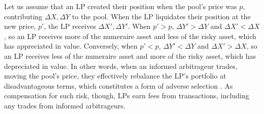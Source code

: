 \documentclass[11pt]{article}
\begin{document}
Let us assume that an LP created their position when the pool's price was $p$, contributing $\Delta X, \Delta Y$ to the pool. When the LP liquidates their position at the new price, $p'$, the LP receives $\Delta X', \Delta Y'$. When $p' > p$, $\Delta Y' > \Delta Y$ and $\Delta X' < \Delta X$, so an LP receives more of the numeraire asset and less of the risky asset, which has appreciated in value. Conversely, when $p' < p$, $\Delta Y' < \Delta Y$ and $\Delta X' > \Delta X$, so an LP receives less of the numeraire asset and more of the risky asset, which has depreciated in value. In other words, when an informed arbitrageur trades, moving the pool's price, they effectively rebalance the LP's portfolio at disadvantageous terms, which constitutes a form of adverse selection \citep{Lehar2021DecentralizedE}.
As compensation for such risk, though, LPs earn fees from transactions, including any trades from informed arbitrageurs.
\end{document}
